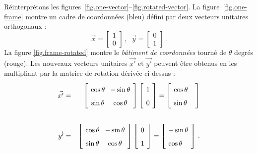 Réinterprétons les figures~\ref{fig.one-vector}--\ref{fig.rotated-vector}. La figure~\ref{fig.one-frame} montre un cadre de coordonnées (bleu) défini par deux vecteurs unitaires orthogonaux :
\[
\vec{x}= \left[\begin{array}{c}1\\0\end{array}\right]\,,\;\;
\vec{y}= \left[\begin{array}{c}0\\1\end{array}\right]\,.
\]
La figure \ref{fig.frame-rotated} montre le \emph{bâtiment de coordonnées} tourné de $\theta$ degrés (rouge). Les nouveaux vecteurs unitaires $\vec{x'}$ et $\vec{y'}$ peuvent être obtenus en les multipliant par la matrice de rotation dérivée ci-dessus :
\begin{eqnarray*}
\vec{x'}&=&
\left[\spacearray\begin{array}{cc}\cos\theta&-\sin\theta\\\sin\theta&\cos\theta\end{array}\right]
\left[\spacearray\begin{array}{c}1\\0\end{array}\right]=
\left[\spacearray\begin{array}{l}\cos \theta\\\sin\theta\;\;\:\end{array}\right]\\
\,\\
\vec{y'}&=&
\left[\spacearray\begin{array}{cc}\cos\theta&-\sin\theta\\\sin\theta&\cos\theta\end{array}\right]
\left[\spacearray\begin{array}{c}0\\1\end{array}\right]=
\left[\spacearray\begin{array}{l}-\sin \theta\\\cos\theta\end{array}\right]\,.
\end{eqnarray*}


